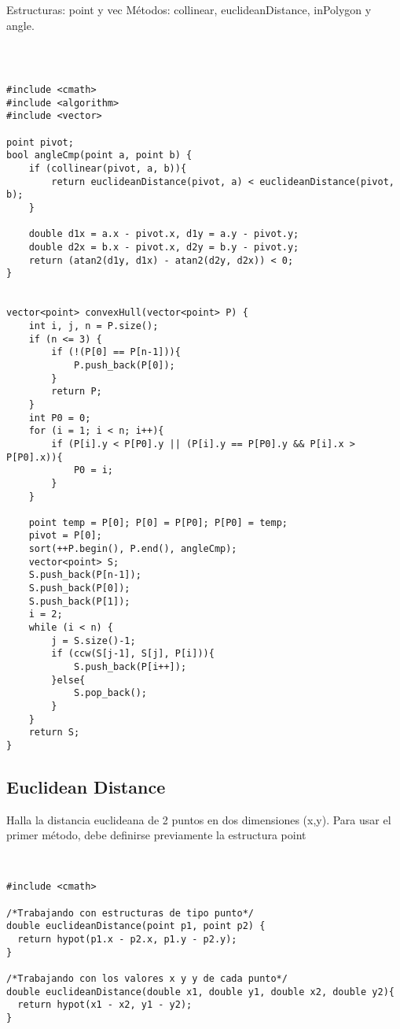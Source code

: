 \documentclass[11pt,letterpaper,twocolumn,twosided]{article}
\begin{document}
Estructuras: point y vec
M\'etodos: collinear, euclideanDistance, inPolygon y angle.
\begin{lstlisting}



#include <cmath>
#include <algorithm>
#include <vector>

point pivot;
bool angleCmp(point a, point b) {                
	if (collinear(pivot, a, b)){
		return euclideanDistance(pivot, a) < euclideanDistance(pivot, b);
	}                              
        
  	double d1x = a.x - pivot.x, d1y = a.y - pivot.y;
  	double d2x = b.x - pivot.x, d2y = b.y - pivot.y;
  	return (atan2(d1y, d1x) - atan2(d2y, d2x)) < 0; 
}


vector<point> convexHull(vector<point> P) {  
  	int i, j, n = P.size();
  	if (n <= 3) {
    	if (!(P[0] == P[n-1])){
    		P.push_back(P[0]);
    	}  
    	return P;
  	}
  	int P0 = 0;
  	for (i = 1; i < n; i++){
  		if (P[i].y < P[P0].y || (P[i].y == P[P0].y && P[i].x > P[P0].x)){
  	 		P0 = i;
  	 	}
  	}

  	point temp = P[0]; P[0] = P[P0]; P[P0] = temp; 
	pivot = P[0];
  	sort(++P.begin(), P.end(), angleCmp);     
	vector<point> S;
  	S.push_back(P[n-1]); 
  	S.push_back(P[0]); 
  	S.push_back(P[1]);   
  	i = 2;                                         
  	while (i < n) {           
    	j = S.size()-1;
    	if (ccw(S[j-1], S[j], P[i])){
    		S.push_back(P[i++]);
    	}else{
    		S.pop_back();
    	}  
    }  
  	return S; 
}  
\end{lstlisting}

\subsection{Euclidean Distance}
Halla la distancia euclideana de 2 puntos en dos dimensiones (x,y). Para usar el primer m\'etodo, debe definirse previamente la estructura point
\begin{lstlisting}


#include <cmath>

/*Trabajando con estructuras de tipo punto*/
double euclideanDistance(point p1, point p2) {           
  return hypot(p1.x - p2.x, p1.y - p2.y); 
} 

/*Trabajando con los valores x y y de cada punto*/
double euclideanDistance(double x1, double y1, double x2, double y2){           
  return hypot(x1 - x2, y1 - y2); 
} 
\end{lstlisting}
\end{document}
